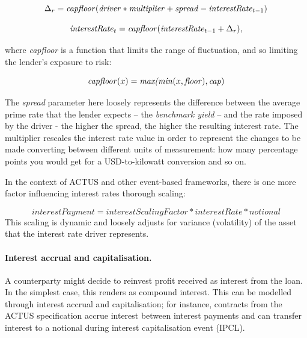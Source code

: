 \documentclass[runningheads]{llncs}
\newcommand{\ident}[1]{\mbox{\emph{#1}}}
\begin{document}

\noindent 
\begin{equation}
\Delta_{r}=\ident{capfloor}(\ident{driver}*\ident{multiplier}+\ident{spread}-\ident{interestRate}_{t-1})
\end{equation}

\noindent 
\begin{equation}
\ident{interestRate}_{t}=\ident{capfloor}(\ident{interestRate}_{t-1}+\Delta_{r}),
\end{equation}

\noindent
where \emph{capfloor} is a function that limits the range of fluctuation,  
and so limiting the lender's exposure to risk:

\noindent 
\begin{equation}
\ident{capfloor}(x)=\ident{max(min}(x,\ident{floor}),\ident{cap})
\end{equation}

\noindent
The \emph{spread} parameter here loosely represents the difference between
the average prime 
rate that the lender expects -- the \emph{benchmark yield} -- and
the rate imposed by the driver - the higher the spread, the higher
the resulting interest rate. The multiplier %
rescales the interest rate value 
in order to represent the changes to be made converting between different units
of measurement: how many percentage points 
you would get for a USD-to-kilowatt conversion
and so on.

In the context of ACTUS and other event-based frameworks, 
there is
one more factor influencing interest rates thorough scaling:

\noindent 
\begin{equation}
interestPayment=interestScalingFactor*interestRate*notional
\end{equation}
\noindent
This scaling is dynamic and loosely adjusts for variance (volatility)
of the asset that the interest rate driver represents.

\paragraph*{Interest accrual and capitalisation. }

A counterparty might decide to reinvest profit received as interest
from the %
loan. In the simplest case, this renders as compound
interest. This can be modelled through interest accrual and capitalisation;
for instance, contracts from the ACTUS specification accrue interest
between interest payments and can transfer interest to a notional
during interest capitalisation event (IPCL).
\end{document}
